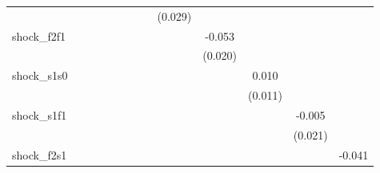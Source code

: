 {\begin{tabular}{l*{12}{c}}
            &                     &                     &                     &                     &                     &                     &                     &     (0.029)         &                     &                     &                     &                     \\
\addlinespace
shock\_f2f1  &                     &                     &                     &                     &                     &                     &                     &                     &      -0.053\sym{**} &                     &                     &                     \\
            &                     &                     &                     &                     &                     &                     &                     &                     &     (0.020)         &                     &                     &                     \\
\addlinespace
shock\_s1s0  &                     &                     &                     &                     &                     &                     &                     &                     &                     &       0.010         &                     &                     \\
            &                     &                     &                     &                     &                     &                     &                     &                     &                     &     (0.011)         &                     &                     \\
\addlinespace
shock\_s1f1  &                     &                     &                     &                     &                     &                     &                     &                     &                     &                     &      -0.005         &                     \\
            &                     &                     &                     &                     &                     &                     &                     &                     &                     &                     &     (0.021)         &                     \\
\addlinespace
shock\_f2s1  &                     &                     &                     &                     &                     &                     &                     &                     &                     &                     &                     &      -0.041\sym{**} \\

\end{tabular}}
